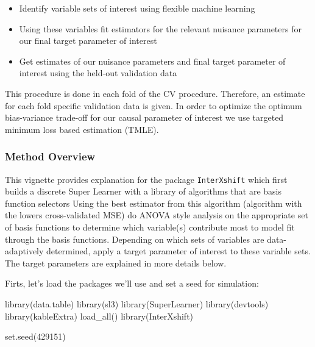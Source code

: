\documentclass[
]{article}
\newenvironment{Shaded}{\begin{snugshade}}{\end{snugshade}}
\newcommand{\DecValTok}[1]{\textcolor[rgb]{0.00,0.00,0.81}{#1}}
\newcommand{\FunctionTok}[1]{\textcolor[rgb]{0.00,0.00,0.00}{#1}}
\newcommand{\NormalTok}[1]{#1}
\providecommand{\tightlist}{%
  \setlength{\itemsep}{0pt}\setlength{\parskip}{0pt}}
\begin{document}
\begin{itemize}
\tightlist
\item
  Identify variable sets of interest using flexible machine learning
\item
  Using these variables fit estimators for the relevant nuisance
  parameters for our final target parameter of interest
\item
  Get estimates of our nuisance parameters and final target parameter of
  interest using the held-out validation data
\end{itemize}

This procedure is done in each fold of the CV procedure. Therefore, an
estimate for each fold specific validation data is given. In order to
optimize the optimum bias-variance trade-off for our causal parameter of
interest we use targeted minimum loss based estimation (TMLE).

\hypertarget{method-overview}{%
\subsubsection{Method Overview}\label{method-overview}}

This vignette provides explanation for the package \texttt{InterXshift}
which first builds a discrete Super Learner with a library of algorithms
that are basis function selectors Using the best estimator from this
algorithm (algorithm with the lowers cross-validated MSE) do ANOVA style
analysis on the appropriate set of basis functions to determine which
variable(s) contribute most to model fit through the basis functions.
Depending on which sets of variables are data-adaptively determined,
apply a target parameter of interest to these variable sets. The target
parameters are explained in more details below.

Firts, let's load the packages we'll use and set a seed for simulation:

\begin{Shaded}
\begin{Highlighting}[]
\FunctionTok{library}\NormalTok{(data.table)}
\FunctionTok{library}\NormalTok{(sl3)}
\FunctionTok{library}\NormalTok{(SuperLearner)}
\FunctionTok{library}\NormalTok{(devtools)}
\FunctionTok{library}\NormalTok{(kableExtra)}
\FunctionTok{load\_all}\NormalTok{()}
\FunctionTok{library}\NormalTok{(InterXshift)}

\FunctionTok{set.seed}\NormalTok{(}\DecValTok{429151}\NormalTok{)}
\end{Highlighting}
\end{Shaded}
\end{document}
